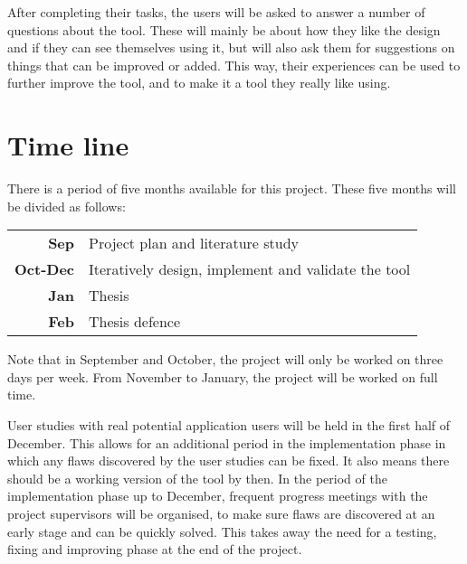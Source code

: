 After completing their tasks, the users will be asked to answer a number of questions about the tool. These will mainly be about how they like the design and if they can see themselves using it, but will also ask them for suggestions on things that can be improved or added. This way, their experiences can be used to further improve the tool, and to make it a tool they really like using.


\section{Time line}

There is a period of five months available for this project. These five months will be divided as follows:

\noindent
\begin{tabular}{r|l}
\textbf{Sep} & Project plan and literature study\\
\textbf{Oct-Dec} & Iteratively design, implement and validate the tool\\
\textbf{Jan} & Thesis\\
\textbf{Feb} & Thesis defence
\end{tabular}

\noindent
Note that in September and October, the project will only be worked on three days per week. From November to January, the project will be worked on full time.

User studies with real potential application users will be held in the first half of December. This allows for an additional period in the implementation phase in which any flaws discovered by the user studies can be fixed. It also means there should be a working version of the tool by then. In the period of the implementation phase up to December, frequent progress meetings with the project supervisors will be organised, to make sure flaws are discovered at an early stage and can be quickly solved. This takes away the need for a testing, fixing and improving phase at the end of the project.
